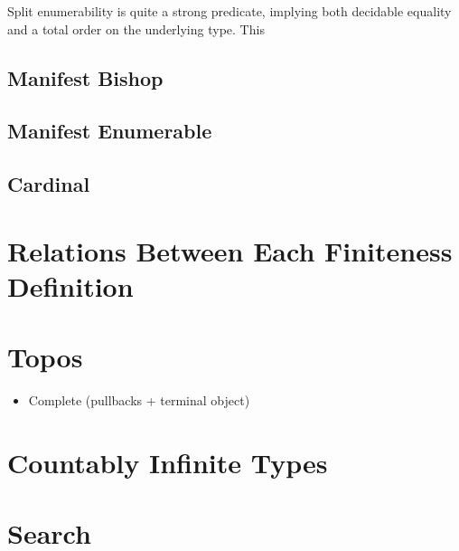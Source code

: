 Split enumerability is quite a strong predicate, implying both decidable
equality and a total order on the underlying type.
This 


\subsection{Manifest Bishop}
\subsection{Manifest Enumerable}
\subsection{Cardinal}
\section{Relations Between Each Finiteness Definition}
\section{Topos}
\begin{itemize}
  \item Complete (pullbacks + terminal object)
\end{itemize}
\section{Countably Infinite Types}
\section{Search}







